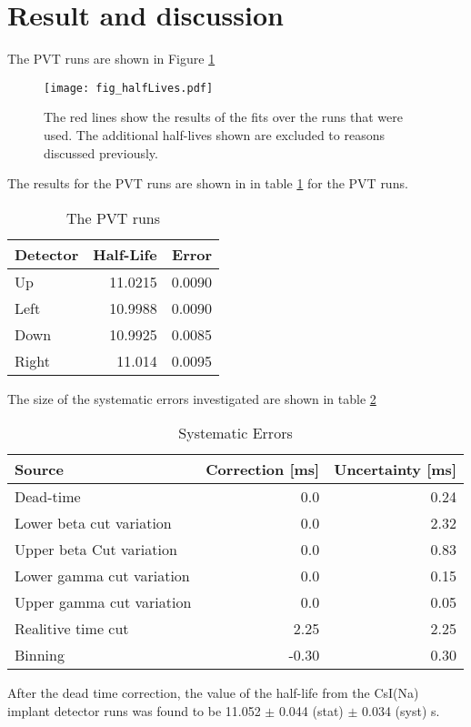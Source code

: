 \section{Result and discussion}
\label{sec:result}

The PVT runs are shown in Figure \ref{fig:PVT2by2}

\begin{figure}[!htb]
	\centerline{\texttt{[image: fig\_halfLives.pdf]}}
	\caption{The red lines show the results of the fits over the runs that were used.
		 The additional half-lives shown are excluded to reasons discussed previously. 
		}
	\label{fig:PVT2by2}
\end{figure}

The results for the PVT runs are shown in  in table \ref{tab:PVTTable} for the PVT runs.
	\begin{table}[!hbt]
			\caption{The PVT runs}
			\begin{tabular}{l|r|r}
			Detector & Half-Life & Error \\ \hline
			Up & 11.0215 & 0.0090 \\
			Left & 10.9988 & 0.0090 \\
			Down & 10.9925 & 0.0085 \\
			Right & 11.014 & 0.0095 
			\end{tabular}
			\label{tab:PVTTable}
	\end{table}

The size of the systematic errors investigated are shown in table \ref{tab:SysTable} 

\begin{table}[!hbt]
\caption{Systematic Errors}
	\label{tab:err-budget}
		\begin{tabular}{l|r|r}
		Source & Correction [ms] & Uncertainty [ms] \\ \hline
		Dead-time & 0.0 & 0.24 \\
		Lower beta cut variation & 0.0 & 2.32 \\
		Upper beta Cut variation & 0.0 & 0.83 \\
		Lower gamma cut variation & 0.0 &  0.15\\
		Upper gamma cut variation & 0.0 & 0.05 \\ 
		Realitive time cut & 2.25 & 2.25 \\
		Binning & -0.30 & 0.30
		\end{tabular}
	\label{tab:SysTable}
\end{table}
After the dead time correction, the value of the half-life from the CsI(Na) implant detector runs was found to be 11.052 $\pm$ 0.044 (stat) $\pm$ 0.034 (syst) s.

